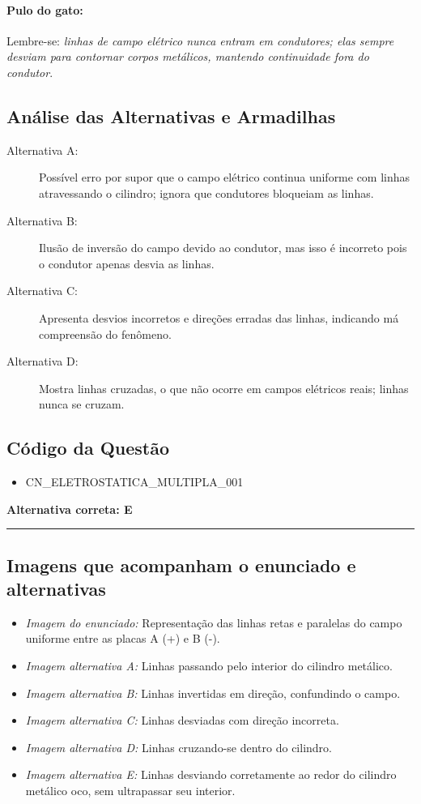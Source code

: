 \documentclass{article}
\begin{document}
\paragraph{Pulo do gato:}
Lembre-se: \textit{linhas de campo elétrico nunca entram em condutores; elas sempre desviam para contornar corpos metálicos, mantendo continuidade fora do condutor}.

\subsection*{Análise das Alternativas e Armadilhas}
\begin{description}
  \item[Alternativa A:] Possível erro por supor que o campo elétrico continua uniforme com linhas atravessando o cilindro; ignora que condutores bloqueiam as linhas.
  \item[Alternativa B:] Ilusão de inversão do campo devido ao condutor, mas isso é incorreto pois o condutor apenas desvia as linhas.
  \item[Alternativa C:] Apresenta desvios incorretos e direções erradas das linhas, indicando má compreensão do fenômeno.
  \item[Alternativa D:] Mostra linhas cruzadas, o que não ocorre em campos elétricos reais; linhas nunca se cruzam.
\end{description}

\subsection*{Código da Questão}
\begin{itemize}
  \item CN\_ELETROSTATICA\_MULTIPLA\_001
\end{itemize}

\bigskip
\noindent \textbf{\large Alternativa correta: E}

\bigskip
\noindent \rule{\textwidth}{0.5pt}

\subsection*{Imagens que acompanham o enunciado e alternativas}

\begin{itemize}
  \item \textit{Imagem do enunciado:} Representação das linhas retas e paralelas do campo uniforme entre as placas A (+) e B (-).
  \item \textit{Imagem alternativa A:} Linhas passando pelo interior do cilindro metálico.
  \item \textit{Imagem alternativa B:} Linhas invertidas em direção, confundindo o campo.
  \item \textit{Imagem alternativa C:} Linhas desviadas com direção incorreta.
  \item \textit{Imagem alternativa D:} Linhas cruzando-se dentro do cilindro.
  \item \textit{Imagem alternativa E:} Linhas desviando corretamente ao redor do cilindro metálico oco, sem ultrapassar seu interior.
\end{itemize}
\end{document}
